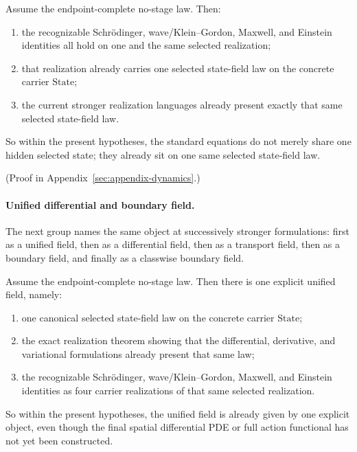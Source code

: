 \begin{corollary}
\label{cor:endpoint-complete-no-stage-law-puts-the-flagship-equations-on-one-shared-selected-state-field-law}
Assume the endpoint-complete no-stage law. Then:
\begin{enumerate}[label=(\roman*), leftmargin=2em, itemsep=0.2em]
\item the recognizable Schr\"odinger, wave/Klein--Gordon, Maxwell, and
      Einstein identities all hold on one and the same selected realization;
\item that realization already carries one selected state-field law on the concrete
      carrier \(\mathrm{State}\);
\item the current stronger realization languages already present exactly that
      same selected state-field law.
\end{enumerate}
So within the present hypotheses, the standard equations do not merely
share one hidden selected state; they already sit on one same selected
state-field law.
\end{corollary}

(Proof in Appendix~\ref{sec:appendix-dynamics}.)

\paragraph{Unified differential and boundary field.}
The next group names the same object at successively stronger formulations:
first as a unified field, then as a differential field, then as a transport
field, then as a boundary field, and finally as a classwise boundary field.

\begin{corollary}
\label{cor:endpoint-complete-no-stage-law-already-yields-one-unified-field-package}
Assume the endpoint-complete no-stage law. Then there is one explicit
unified field, namely:
\begin{enumerate}[label=(\roman*), leftmargin=2em, itemsep=0.2em]
\item one canonical selected state-field law on the concrete carrier
      \(\mathrm{State}\);
\item the exact realization theorem showing that the differential,
      derivative, and variational formulations already present
      that same law;
\item the recognizable Schr\"odinger, wave/Klein--Gordon, Maxwell, and
      Einstein identities as four carrier realizations of that same selected
      realization.
\end{enumerate}
So within the present hypotheses, the unified field is already given by one
explicit object, even though the final spatial differential PDE or full
action functional has not yet been
constructed.
\end{corollary}

